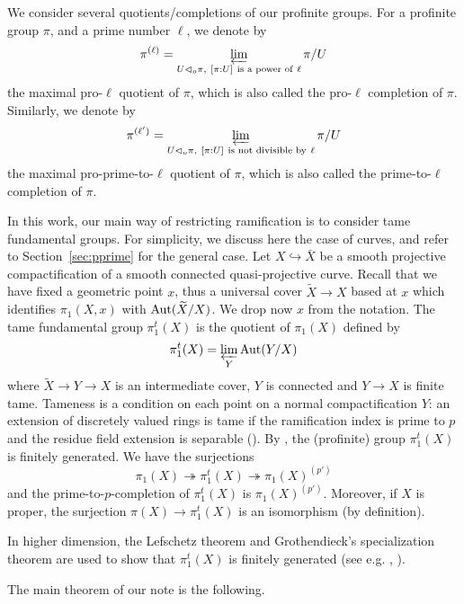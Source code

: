 \documentclass[12pt]{amsart}
\theoremstyle{plain}
\theoremstyle{definition}
\numberwithin{thm}{section}
\renewcommand{\tilde}{\widetilde}
\newcommand{\ga}[2]{\begin{gather}\label{#1}#2 \end{gather}}
\newcommand{\surj}{\twoheadrightarrow}
\numberwithin{equation}{section}
\begin{document}
We consider several quotients/completions of our profinite groups.
For a profinite group $\pi$, and a prime number $\ell$, we denote by
\begin{equation}  
\pi^{(\ell)} = \varprojlim_{\substack{U \lhd_o \pi, \ [\pi : U] \ \text{is a power of} \ \ell }} 
 \pi/U  \notag
\end{equation}
the maximal pro-$\ell$ quotient of $\pi$, which is also called the pro-$\ell$ completion of $\pi$.
Similarly, we denote by 
\begin{equation}
\pi^{(\ell')} = \varprojlim_{\substack{U \lhd_o \pi, \ 
  [\pi : U] \ \text{is not divisible by} \ \ell }} \pi/U \notag
\end{equation}
the maximal pro-prime-to-$\ell$ quotient of $\pi$, which is also called the prime-to-$\ell$ completion of $\pi$.

In this work, our main way of restricting ramification is to consider
tame fundamental groups.
For simplicity, we discuss here the case of curves, and refer to Section~\ref{sec:pprime} for the general case. Let $X\hookrightarrow \bar X$ be a smooth projective compactification of a smooth connected quasi-projective curve. 
Recall that we have fixed a geometric point $x$, thus a universal cover $\tilde X\to X$ based at $x$ which identifies $\pi_1(X,x)$ with ${\rm Aut}(\tilde X/X)$.  We drop now $x$ from the notation.  The tame fundamental group $\pi_1^t(X)$ is the quotient of $\pi_1(X)$ defined by 
\ga{}{ \pi_1^t(X)= \varprojlim_Y {\rm Aut}(Y/X) \notag}
where $\tilde X\to Y\to X$ is an intermediate cover, $Y$ is connected and $Y\to X$ is finite tame.
Tameness is a condition on each point on a normal compactification $Y$: an extension of discretely valued rings is tame if the ramification index is prime to $p$ and the residue field extension is separable (\cite[Definition 2.1.2, p.30]{GM71}).
By \cite[Theorem 10.1.6]{NSW13}, the (profinite) group $\pi_1^t(X)$ is finitely generated. We have the surjections
$$\pi_1(X)\surj \pi_1^t(X)\surj \pi_1(X)^{(p')}$$ and the prime-to-$p$-completion of $\pi_1^t(X)$ is $\pi_1(X)^{(p')}$.  Moreover, if $X$ is proper, the surjection $\pi(X)\to \pi_1^t(X)$ is an isomorphism (by definition).



In higher dimension, the Lefschetz theorem and Grothendieck's specialization theorem are used to show that $\pi^t_1(X)$ is finitely generated  (see e.g. \cite[Corollary 7.2]{Esn17},  \cite[Theorem~1.1 (a)]{EK16}). 


The main theorem of our note is the following.
\end{document}
